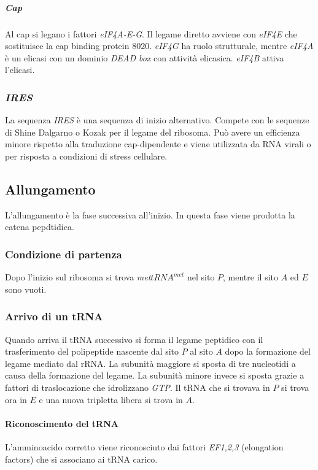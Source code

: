 				\subparagraph{Cap}
				Al cap si legano i fattori \emph{eIF4A-E-G}.
				Il legame diretto avviene con \emph{eIF4E} che sostituisce la cap binding protein $8020$.
				\emph{eIF4G} ha ruolo strutturale, mentre \emph{eIF4A} \`e un elicasi con un dominio \emph{DEAD box} con attivit\`a elicasica.
				\emph{eIF4B} attiva l'elicasi.





		\subsubsection{\emph{IRES}}
		La sequenza \emph{IRES} \`e una sequenza di inizio alternativo.
		Compete con le sequenze di Shine Dalgarno o Kozak per il legame del ribosoma.
		Pu\`o avere un efficienza minore rispetto alla traduzione cap-dipendente e viene utilizzata da RNA virali o per risposta a condizioni di stress cellulare.

	\subsection{Allungamento}
	L'allungamento \`e la fase successiva all'inizio.
	In questa fase viene prodotta la catena pepdtidica.
	
		\subsubsection{Condizione di partenza}
		Dopo l'inizio sul ribosoma si trova \emph{met$tRNA^{met}$} nel sito $P$, mentre il sito $A$ ed $E$ sono vuoti.

		\subsubsection{Arrivo di un tRNA}
		Quando arriva il tRNA successivo si forma il legame peptidico con il trasferimento del polipeptide nascente dal sito $P$ al sito $A$ dopo la formazione del legame mediato dal rRNA.
		La subunit\`a maggiore si sposta di tre nucleotidi a causa della formazione del legame.
		La subunit\`a minore invece si sposta grazie a fattori di traslocazione che idrolizzano \emph{GTP}.
		Il tRNA che si trovava in $P$ si trova ora in $E$ e una nuova tripletta libera si trova in $A$.

			\paragraph{Riconoscimento del tRNA}
			L'amminoacido corretto viene riconosciuto dai fattori \emph{EF1,2,3} (elongation factors) che si associano ai tRNA carico.


